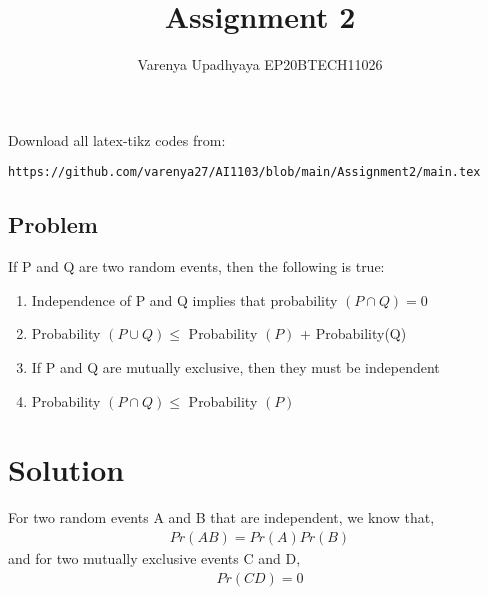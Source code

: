 \documentclass[journal,12pt,twocolumn]{IEEEtran}
\title{Assignment 2}
\author{Varenya Upadhyaya EP20BTECH11026}
\date{}
\begin{document}
\maketitle
Download all latex-tikz codes from:
\begin{lstlisting}
https://github.com/varenya27/AI1103/blob/main/Assignment2/main.tex
\end{lstlisting}
\maketitle   
\begin{center}
\section*{\textbf{Problem}}
\end{center}
If P and Q are two random events, then the following is true:
\begin{enumerate}[label = (\alph*)]
    \item Independence of P and Q implies that probability $(P\cap Q)=0 $ 
    \item Probability $(P\cup Q) \leq   $ Probability $(P)$ + Probability(Q) 
    \item If P and Q are mutually exclusive, then they must be independent
    \item Probability $(P\cap Q) \leq$ Probability $(P)$
\end{enumerate}
\maketitle
\section*{\textbf{Solution}}
For two random events A and B that are independent, we know that, 
\begin{align}
Pr(AB) = Pr(A)Pr(B)
\end{align}
and for two mutually exclusive events C and D, 
\begin{align}
    Pr(CD) = 0
\end{align}
\end{document}
